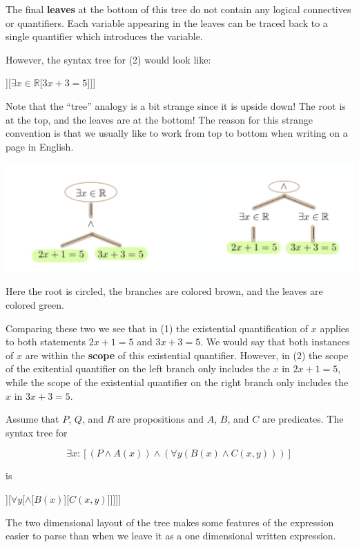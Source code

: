 The  final \textbf{leaves} at the bottom of this tree do not contain any logical connectives or quantifiers.  Each variable appearing in the leaves can be traced back to a single quantifier which introduces the variable.

However, the syntax tree for (2) would look like:

\begin{center}
	\begin{forest}
		[\(\wedge\)[\(\exists x \in \mathbb{R}\)[\( {2x+1 = 5}\)]][\(\exists x \in \mathbb{R}\)[\( {3x+3 = 5}\)]]]
	\end{forest}
\end{center}

Note that the ``tree'' analogy is a bit strange since it is upside down!  The root is at the top, and the leaves are at the bottom!  The reason for this strange convention is that we usually like to work from top to bottom when writing on a page in English.

\includegraphics[scale = 0.4]{trees}

Here the root is circled, the branches are colored brown, and the leaves are colored green.

Comparing these two we see that in (1) the existential quantification of $x$ applies to both statements $2x+1 = 5$ and $3x+3  = 5$.  We would say that both instances of $x$ are within the \textbf{scope} of this existential quantifier.  However, in (2) the scope of the exitential quantifier on the left branch only includes the $x$ in $2x+1  = 5$, while the scope of the existential quantifier on the right branch only includes the $x$ in $3x+3 = 5$.

\begin{example}
	Assume that $P$, $Q$, and $R$ are propositions and $A$, $B$, and $C$ are predicates. The syntax tree for 
	
	\[
	\exists x :[( P \wedge A(x)) \wedge ( \forall y( B(x) \wedge C(x,y) ))]
	\]
	
	is
	
	\begin{center}
		\begin{forest}
			[\(\exists x\)[\(\wedge\)[\(\wedge\)[\(P\)][\(A(x)\)]][\(\forall y \)[\(\wedge\)[\(B(x)\)][\({C(x,y)}\)]]]]]
		\end{forest}
	\end{center}
	
	The two dimensional layout of the tree makes some features of the expression easier to parse than when we leave it as a one dimensional written expression.
\end{example}

